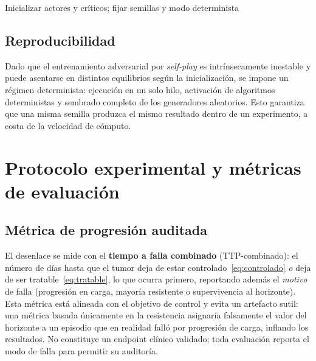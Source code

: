 \begin{algorithm}[H]
\SetAlgoLined
{}
Inicializar actores y críticos; fijar semillas y modo determinista\;
\caption{Entrenamiento adversarial por self-play (MAPPO / IPPO).}
\label{alg:selfplay}
\end{algorithm}

\subsection{Reproducibilidad}

Dado que el entrenamiento adversarial por \emph{self-play} es intrínsecamente inestable y puede asentarse en distintos equilibrios según la inicialización, se impone un régimen determinista: ejecución en un solo hilo, activación de algoritmos deterministas y sembrado completo de los generadores aleatorios. Esto garantiza que una misma semilla produzca el mismo resultado dentro de un experimento, a costa de la velocidad de cómputo.

\section{Protocolo experimental y métricas de evaluación}
\label{sec:protocolo}

\subsection{Métrica de progresión auditada}

El desenlace se mide con el \textbf{tiempo a falla combinado} (TTP-combinado): el número de días hasta que el tumor deja de estar controlado~\eqref{eq:controlado} \emph{o} deja de ser tratable~\eqref{eq:tratable}, lo que ocurra primero, reportando además el \emph{motivo} de falla (progresión en carga, mayoría resistente o supervivencia al horizonte). Esta métrica está alineada con el objetivo de control y evita un artefacto sutil: una métrica basada únicamente en la resistencia asignaría falsamente el valor del horizonte a un episodio que en realidad falló por progresión de carga, inflando los resultados. No constituye un endpoint clínico validado; toda evaluación reporta el modo de falla para permitir su auditoría.

